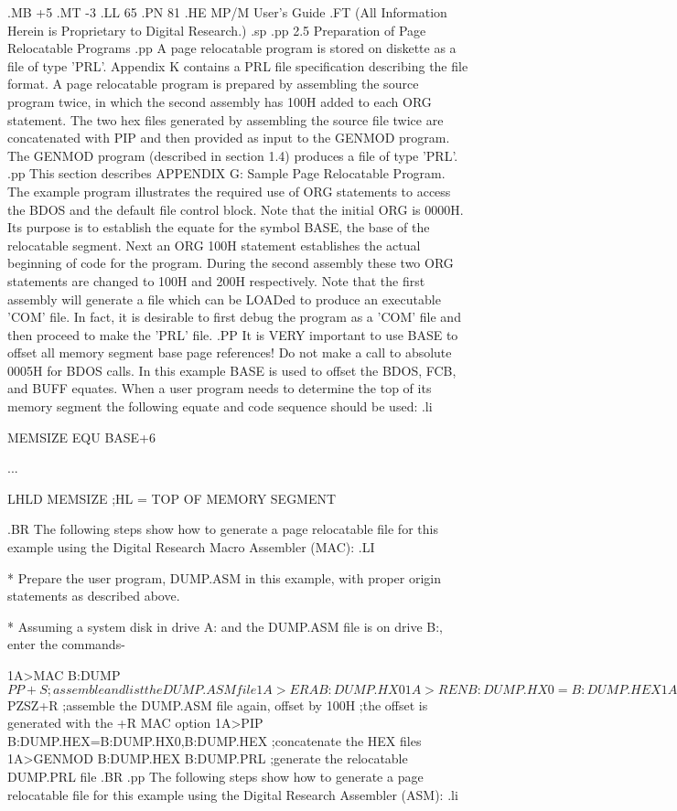 .MB +5
.MT -3
.LL 65
.PN 81
.HE MP/M User's Guide
.FT   (All Information Herein is Proprietary to Digital Research.)
.sp
.pp
2.5  Preparation of Page Relocatable Programs
.pp
A page relocatable program is stored on diskette as a file of type
'PRL'.  Appendix K contains a PRL file specification describing
the file format.  A page relocatable program is prepared by
assembling the source program twice, in which the second
assembly has 100H added to each ORG statement.
The two hex files generated by assembling the source file twice are
concatenated with PIP and then provided as input to the GENMOD
program.  The GENMOD program (described in section 1.4) produces a file of type 'PRL'.
.pp
This section describes APPENDIX G:  Sample Page Relocatable
Program. The example program
illustrates the required use of ORG statements to access the
BDOS and the default file control block.  Note that the initial
ORG is 0000H. Its purpose is to establish the equate for the symbol BASE,
the base of the relocatable segment.  Next an ORG 100H statement
establishes the actual beginning of code for the program.
During the second assembly these two ORG statements are changed to
100H and 200H respectively.  Note that the first assembly will
generate a file which can be LOADed to produce an executable 'COM'
file.  In fact, it is desirable to first debug the program as a
'COM' file and then proceed to make the 'PRL' file.
.PP
It is VERY important to use BASE to offset all memory segment base page
references!  Do not make a call to absolute 0005H for BDOS
calls.  In this example BASE is used to offset the BDOS, FCB, and
BUFF equates.  When a user program needs to determine the top of
its memory segment the following equate and code sequence should
be used:
.li

	MEMSIZE EQU     BASE+6

	        ...

	        LHLD    MEMSIZE ;HL = TOP OF MEMORY SEGMENT

.BR
The following steps show how to generate a page relocatable
file for this example using the Digital Research Macro Assembler (MAC):
.LI

	* Prepare the user program, DUMP.ASM in this example, with
	  proper origin statements as described above.

	* Assuming a system disk in drive A: and the DUMP.ASM file
	  is on drive B:, enter the commands-

	  1A>MAC B:DUMP $PP+S
		;assemble and list the DUMP.ASM file
	  1A>ERA B:DUMP.HX0
	  1A>REN B:DUMP.HX0=B:DUMP.HEX
	  1A>MAC B:DUMP $PZSZ+R
		;assemble the DUMP.ASM file again, offset by 100H
		;the offset is generated with the +R MAC option
	  1A>PIP B:DUMP.HEX=B:DUMP.HX0,B:DUMP.HEX
		;concatenate the HEX files
	  1A>GENMOD B:DUMP.HEX B:DUMP.PRL
		;generate the relocatable DUMP.PRL file
.BR
.pp
The following steps show how to generate a page relocatable
file for this example using the Digital Research Assembler (ASM):
.li

